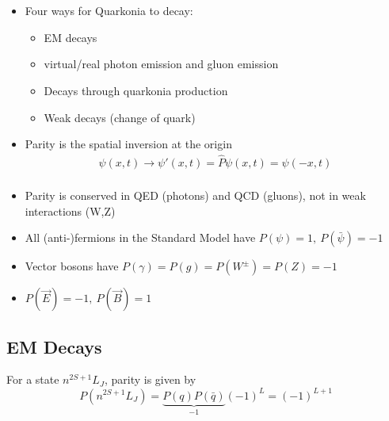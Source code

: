 \documentclass[a4paper, 11pt, normalem]{report}
\begin{document}
\chapter{}
\begin{itemize}
    \item Four ways for Quarkonia to decay:
        \begin{itemize}
            \item  EM decays 
            \item virtual/real photon emission and gluon emission
            \item Decays through quarkonia production
            \item Weak decays (change of quark)
        \end{itemize}
    \item Parity is the spatial inversion at the origin
        \begin{align}
            \psi(x,t) \to \psi'(x,t) = \hat{P}\psi(x,t) = \psi(-x,t) \\
        \end{align}
    \item Parity is conserved in QED (photons) and QCD (gluons), not in weak interactions (W,Z)
    \item All (anti-)fermions in the Standard Model have $P(\psi) = 1,~ P(\bar{\psi}) = -1$
    \item Vector bosons have $P(\gamma) = P(g) = P(W^{\pm}) = P(Z) = -1$
    \item $P(\vec{E}) = -1,~ P(\vec{B}) = 1$
\end{itemize}

\section{EM Decays}
For a state $n^{2S+1}L_J$, parity is given by
\begin{equation}
    P(n^{2S+1}L_J) = \underbrace{P(q)P(\bar{q})}_{-1}(-1)^L = (-1)^{L+1}
\end{equation}
\end{document}
